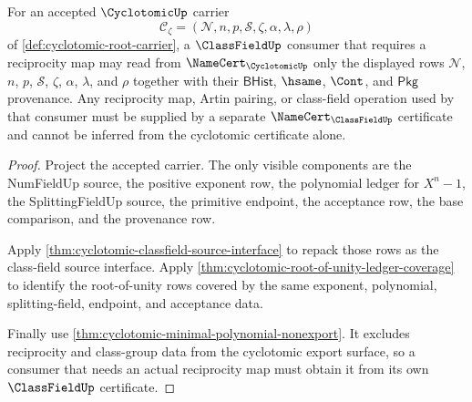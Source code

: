\begin{theorem}
\label{thm:cyclotomic-classfield-reciprocity-input-boundary}
For an accepted $\CyclotomicUp$ carrier
$$
\mathcal{C}_{\zeta}=(\mathcal{N},n,p,\mathcal{S},\zeta,\alpha,\lambda,\rho)
$$
of \autoref{def:cyclotomic-root-carrier}, a $\ClassFieldUp$ consumer that requires a reciprocity map may read from $\NameCert_{\CyclotomicUp}$ only the displayed rows $\mathcal{N}$, $n$, $p$, $\mathcal{S}$, $\zeta$, $\alpha$, $\lambda$, and $\rho$ together with their $\mathsf{BHist}$, $\hsame$, $\Cont$, and $\mathsf{Pkg}$ provenance. Any reciprocity map, Artin pairing, or class-field operation used by that consumer must be supplied by a separate $\NameCert_{\ClassFieldUp}$ certificate and cannot be inferred from the cyclotomic certificate alone.
\end{theorem}
\begin{proof}
Project the accepted carrier. The only visible components are the NumFieldUp source, the positive exponent row, the polynomial ledger for $X^n-1$, the SplittingFieldUp source, the primitive endpoint, the acceptance row, the base comparison, and the provenance row.

Apply \autoref{thm:cyclotomic-classfield-source-interface} to repack those rows as the class-field source interface. Apply \autoref{thm:cyclotomic-root-of-unity-ledger-coverage} to identify the root-of-unity rows covered by the same exponent, polynomial, splitting-field, endpoint, and acceptance data.

Finally use \autoref{thm:cyclotomic-minimal-polynomial-nonexport}. It excludes reciprocity and class-group data from the cyclotomic export surface, so a consumer that needs an actual reciprocity map must obtain it from its own $\ClassFieldUp$ certificate.
\end{proof}

